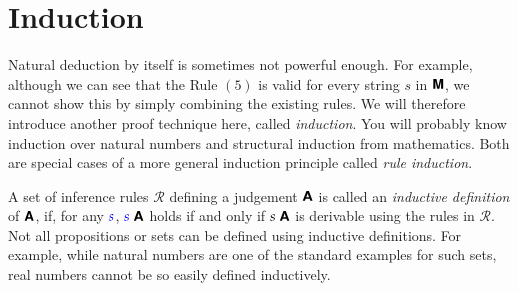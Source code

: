 \documentclass{book}
\begin{document}
\section{Induction} 

Natural deduction by itself is sometimes not powerful enough. For example,
although we can see that the Rule $(5)$ is valid for every string $s$
in $\textsf{\textbf{M}}$, we cannot show this by simply combining the existing rules. We will
therefore introduce another proof technique here, called \emph{induction}. You
will probably know induction over natural numbers and structural induction
from mathematics. Both are special cases of a more
general induction principle called \emph{rule induction}. 

A set of inference rules $\mathcal{R}$ defining a judgement $\textsf{\textbf{A}}$ is 
called an \emph{inductive definition} of $\textsf{\textbf{A}}$, if, for any $\textcolor{blue}{s}$, ${\textcolor{blue}{s}}\;\textsf{\textbf{A}}$ 
holds if and only if ${s}\;\textsf{\textbf{A}}$ is derivable using the rules in $\mathcal{R}$.
Not all propositions or sets can be defined using inductive
definitions. For example, while natural numbers are one of the standard
examples for such sets, real numbers cannot be so easily defined inductively.
\end{document}
